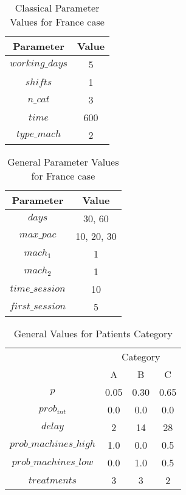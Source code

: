 \begin{table}[h!]
\centering
\begin{tabular}{|c|c|}
			\hline
			Parameter & Value\\
			\hline
			 $working\_days$	& 5\\
			 $shifts$		& 1\\
			 $n\_cat$		& 3\\
			 $time$			& 600\\
			 $type\_mach$		& 2\\
			 \hline
\end{tabular}
\caption{Classical Parameter Values for France case}
\end{table}

\begin{table}[h!]
\centering
\begin{tabular}{|c|c|}
			\hline
			Parameter & Value\\
			\hline
			 $days$		 & 30, 60\\
			 $max\_pac$	 & 10, 20, 30\\
			 $mach_1$	 & 1\\
			 $mach_2$	 & 1\\
			 $time\_session$ & 10\\
			 $first\_session$& 5\\
			 \hline
\end{tabular}
\caption{General Parameter Values for France case}
\end{table}

\begin{table}[h]
\begin{tabular}{c|c|c|c|}
\cline{2-4}
                                             & \multicolumn{3}{c|}{Category} \\ \cline{2-4} 
                                             & A        & B        & C       \\ \hline
\multicolumn{1}{|c|}{$p$}                    & 0.05     & 0.30     & 0.65    \\ \hline
\multicolumn{1}{|c|}{$prob_{int}$}           & 0.0      & 0.0      & 0.0     \\ \hline
\multicolumn{1}{|c|}{$delay$}                & 2        & 14       & 28      \\ \hline
\multicolumn{1}{|c|}{$prob\_machines\_high$} & 1.0      & 0.0      & 0.5     \\ \hline
\multicolumn{1}{|c|}{$prob\_machines\_low$}  & 0.0      & 1.0      & 0.5     \\ \hline
\multicolumn{1}{|c|}{$treatments$}           & 3        & 3        & 2        \\ \hline
\end{tabular}
\caption{General Values for Patients Category}
\end{table}


